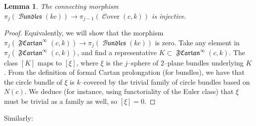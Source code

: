 \documentclass[10pt]{amsart}
\newcommand{\Cover}{\operatorname{\mathcal{C}over}}
\newcommand{\FCartan}{\operatorname{\mathfrak{FCartan}}}
\newcommand{\Bundles}{\operatorname{\mathcal{B}\mathfrak{undles}}}
\newtheorem{lemma}{Lemma}
\theoremstyle{definition}
\begin{document}
\begin{lemma} \label{lem:injectivity}
The connecting morphism $\pi_j(\Bundles(kc)) \to  \pi_{j-1}(\Cover(c,k))$ is injective.
\end{lemma}
\begin{proof}
Equivalently, we will show that the morphism $\pi_j(\FCartan^\infty(c,k)) \to \pi_j(\Bundles(kc))$ is zero. Take any element in $\pi_j(\FCartan^\infty(c,k))$, and find a representative $K \subset \FCartan^\infty(c,k)$. The class $[K]$ maps to $[\xi]$, where $\xi$ is the $j$--sphere of $2$--plane bundles underlying $K$. From the definition of formal Cartan prolongation (for bundles), we have that the circle bundle of $\xi$ is $k$--covered by the trivial family of circle bundles based on $N(c)$. We deduce (for instance, using functoriality of the Euler class) that $\xi$ must be trivial as a family as well, so $[\xi] = 0$.
\end{proof}

Similarly:
\end{document}
